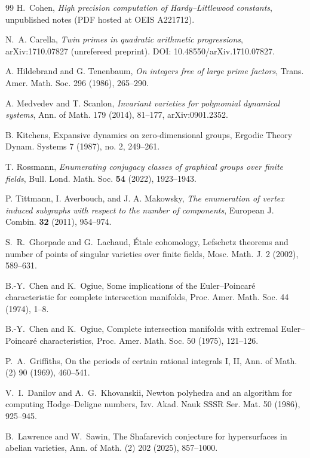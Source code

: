 \documentclass[11pt]{article}
\theoremstyle{definition}
\begin{document}
\begin{thebibliography}{99}
 H.~Cohen,
\emph{High precision computation of Hardy--Littlewood constants},
unpublished notes (PDF hosted at OEIS A221712).

 N.~A. Carella,
\emph{Twin primes in quadratic arithmetic progressions},
arXiv:1710.07827 (unrefereed preprint).
DOI: 10.48550/arXiv.1710.07827.


 A. Hildebrand and G. Tenenbaum,
\emph{On integers free of large prime factors},
Trans. Amer. Math. Soc. 296 (1986), 265--290.

 A. Medvedev and T. Scanlon,
\emph{Invariant varieties for polynomial dynamical systems},
Ann. of Math. 179 (2014), 81--177, arXiv:0901.2352.


B. Kitchens,
Expansive dynamics on zero-dimensional groups,
Ergodic Theory Dynam. Systems 7 (1987), no. 2, 249--261.

 T. Rossmann, \emph{Enumerating conjugacy classes of graphical groups over finite fields}, Bull. Lond. Math. Soc. \textbf{54} (2022), 1923--1943.

 P. Tittmann, I. Averbouch, and J. A. Makowsky, \emph{The enumeration of vertex induced subgraphs with respect to the number of components}, European J. Combin. \textbf{32} (2011), 954--974.

 S.~R.~Ghorpade and G.~Lachaud, \'Etale cohomology, Lefschetz theorems and number of points of singular varieties over finite fields, Mosc. Math. J. 2 (2002), 589--631.

 B.-Y.~Chen and K.~Ogiue, Some implications of the Euler--Poincar\'e characteristic for complete intersection manifolds, Proc. Amer. Math. Soc. 44 (1974), 1--8.

 B.-Y.~Chen and K.~Ogiue, Complete intersection manifolds with extremal Euler--Poincar\'e characteristics, Proc. Amer. Math. Soc. 50 (1975), 121--126.

 P.~A.~Griffiths, On the periods of certain rational integrals I, II, Ann. of Math. (2) 90 (1969), 460--541.

 V.~I.~Danilov and A.~G.~Khovanskii, Newton polyhedra and an algorithm for computing Hodge--Deligne numbers, Izv. Akad. Nauk SSSR Ser. Mat. 50 (1986), 925--945.

 B.~Lawrence and W.~Sawin, The Shafarevich conjecture for hypersurfaces in abelian varieties, Ann. of Math. (2) 202 (2025), 857--1000.


\end{thebibliography}
\end{document}
